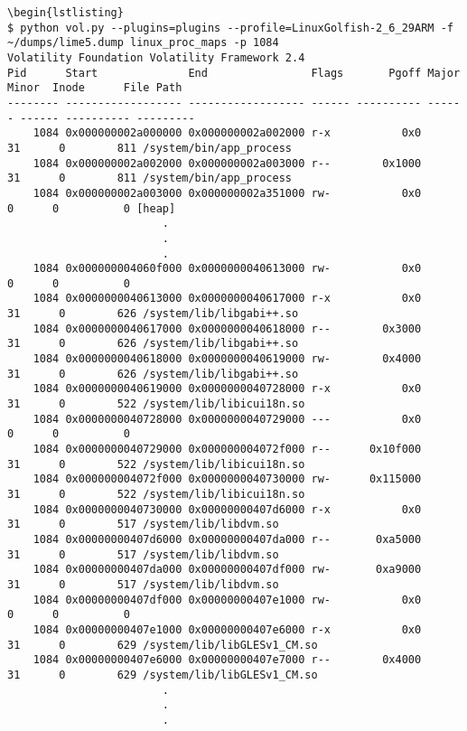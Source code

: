 \begin{lstlisting}
\begin{lstlisting}
$ python vol.py --plugins=plugins --profile=LinuxGolfish-2_6_29ARM -f ~/dumps/lime5.dump linux_proc_maps -p 1084
Volatility Foundation Volatility Framework 2.4
Pid      Start              End                Flags       Pgoff Major  Minor  Inode      File Path
-------- ------------------ ------------------ ------ ---------- ------ ------ ---------- ---------
    1084 0x000000002a000000 0x000000002a002000 r-x           0x0     31      0        811 /system/bin/app_process
    1084 0x000000002a002000 0x000000002a003000 r--        0x1000     31      0        811 /system/bin/app_process
    1084 0x000000002a003000 0x000000002a351000 rw-           0x0      0      0          0 [heap]
						.
						.
						.
    1084 0x000000004060f000 0x0000000040613000 rw-           0x0      0      0          0 
    1084 0x0000000040613000 0x0000000040617000 r-x           0x0     31      0        626 /system/lib/libgabi++.so
    1084 0x0000000040617000 0x0000000040618000 r--        0x3000     31      0        626 /system/lib/libgabi++.so
    1084 0x0000000040618000 0x0000000040619000 rw-        0x4000     31      0        626 /system/lib/libgabi++.so
    1084 0x0000000040619000 0x0000000040728000 r-x           0x0     31      0        522 /system/lib/libicui18n.so
    1084 0x0000000040728000 0x0000000040729000 ---           0x0      0      0          0 
    1084 0x0000000040729000 0x000000004072f000 r--      0x10f000     31      0        522 /system/lib/libicui18n.so
    1084 0x000000004072f000 0x0000000040730000 rw-      0x115000     31      0        522 /system/lib/libicui18n.so
    1084 0x0000000040730000 0x00000000407d6000 r-x           0x0     31      0        517 /system/lib/libdvm.so
    1084 0x00000000407d6000 0x00000000407da000 r--       0xa5000     31      0        517 /system/lib/libdvm.so
    1084 0x00000000407da000 0x00000000407df000 rw-       0xa9000     31      0        517 /system/lib/libdvm.so
    1084 0x00000000407df000 0x00000000407e1000 rw-           0x0      0      0          0 
    1084 0x00000000407e1000 0x00000000407e6000 r-x           0x0     31      0        629 /system/lib/libGLESv1_CM.so
    1084 0x00000000407e6000 0x00000000407e7000 r--        0x4000     31      0        629 /system/lib/libGLESv1_CM.so
						.
						.
						.
\end{lstlisting}

